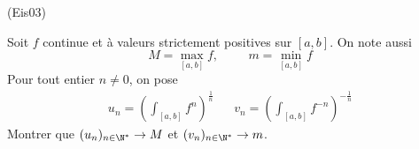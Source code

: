 \begin{tiny}(Eis03)\end{tiny}
Soit $f$ continue et à valeurs strictement positives sur $[a,b]$. On note aussi
\begin{displaymath}
 M = \max_{[a,b]}f , \hspace{1cm} m=\min_{[a,b]}f
\end{displaymath}
Pour tout entier $n\neq 0$, on pose
\begin{align*}
u_n = \left( \int_{[a,b]}f^n\right)^\frac{1}{n} & &
v_n = \left( \int_{[a,b]}f^{-n}\right)^{-\frac{1}{n}} 
\end{align*}
Montrer que $(u_n)_{n\in\N^*}\rightarrow M$ et $(v_n)_{n\in\N^*}\rightarrow m$. 
